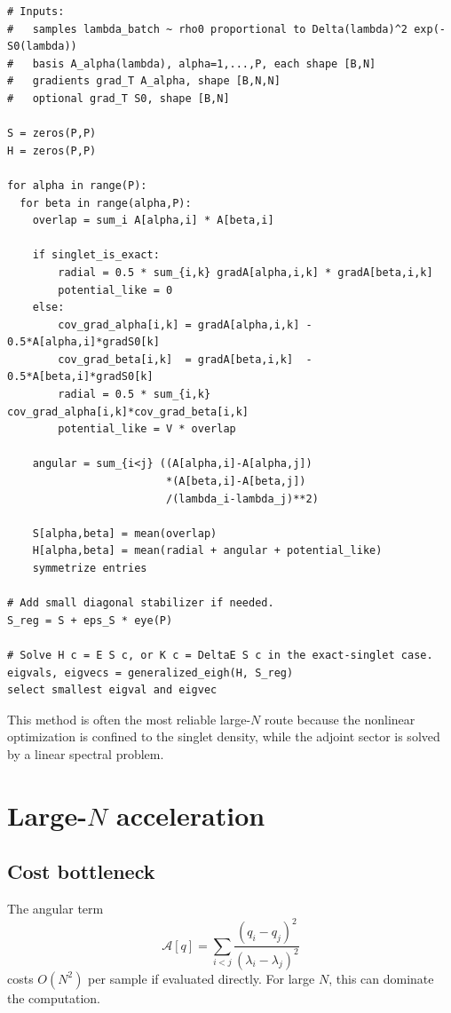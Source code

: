 \documentclass[11pt]{article}
\newcommand{\calA}{\mathcal A}
\begin{document}
\begin{lstlisting}
# Inputs:
#   samples lambda_batch ~ rho0 proportional to Delta(lambda)^2 exp(-S0(lambda))
#   basis A_alpha(lambda), alpha=1,...,P, each shape [B,N]
#   gradients grad_T A_alpha, shape [B,N,N]
#   optional grad_T S0, shape [B,N]

S = zeros(P,P)
H = zeros(P,P)

for alpha in range(P):
  for beta in range(alpha,P):
    overlap = sum_i A[alpha,i] * A[beta,i]

    if singlet_is_exact:
        radial = 0.5 * sum_{i,k} gradA[alpha,i,k] * gradA[beta,i,k]
        potential_like = 0
    else:
        cov_grad_alpha[i,k] = gradA[alpha,i,k] - 0.5*A[alpha,i]*gradS0[k]
        cov_grad_beta[i,k]  = gradA[beta,i,k]  - 0.5*A[beta,i]*gradS0[k]
        radial = 0.5 * sum_{i,k} cov_grad_alpha[i,k]*cov_grad_beta[i,k]
        potential_like = V * overlap

    angular = sum_{i<j} ((A[alpha,i]-A[alpha,j])
                         *(A[beta,i]-A[beta,j])
                         /(lambda_i-lambda_j)**2)

    S[alpha,beta] = mean(overlap)
    H[alpha,beta] = mean(radial + angular + potential_like)
    symmetrize entries

# Add small diagonal stabilizer if needed.
S_reg = S + eps_S * eye(P)

# Solve H c = E S c, or K c = DeltaE S c in the exact-singlet case.
eigvals, eigvecs = generalized_eigh(H, S_reg)
select smallest eigval and eigvec
\end{lstlisting}

This method is often the most reliable large-$N$ route because the nonlinear optimization is confined to the singlet density, while the adjoint sector is solved by a linear spectral problem.

\section{Large-$N$ acceleration}

\subsection{Cost bottleneck}

The angular term
\begin{equation}
\calA[q]
=\sum_{i<j}\frac{(q_i-q_j)^2}{(\lambda_i-\lambda_j)^2}
\end{equation}
costs $O(N^2)$ per sample if evaluated directly.  For large $N$, this can dominate the computation.
\end{document}
